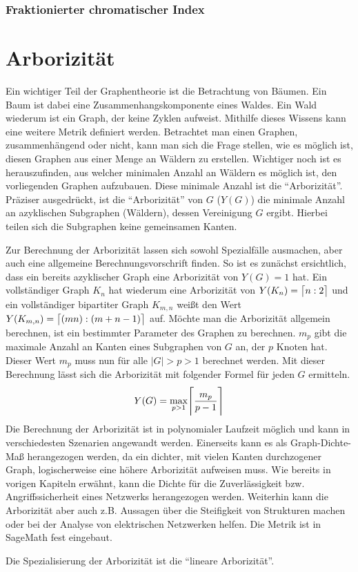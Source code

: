 \documentclass[a4paper,12pt,ngerman,chapterprefix=false,listof=totoc,bibliography=totoc]{scrreprt}
\DeclarePairedDelimiter{\ceil}{\lceil}{\rceil}
\begin{document}
\subsubsection*{Fraktionierter chromatischer Index}
{

}

\section{Arborizität}
{
Ein wichtiger Teil der Graphentheorie ist die Betrachtung von Bäumen. Ein Baum ist dabei eine Zusammenhangskomponente eines Waldes. Ein Wald wiederum ist ein Graph, der keine Zyklen aufweist. Mithilfe dieses Wissens kann eine weitere Metrik definiert werden. Betrachtet man einen Graphen, zusammenhängend oder nicht, kann man sich die Frage stellen, wie es möglich ist, diesen Graphen aus einer Menge an Wäldern zu erstellen. Wichtiger noch ist es herauszufinden, aus welcher minimalen Anzahl an Wäldern es möglich ist, den vorliegenden Graphen aufzubauen. Diese minimale Anzahl ist die "`Arborizität"'. Präziser ausgedrückt, ist die "`Arborizität"' von \(G\) (\(Y(G)\)) die minimale Anzahl an azyklischen Subgraphen (Wäldern), dessen Vereinigung \(G\) ergibt. Hierbei teilen sich die Subgraphen keine gemeinsamen Kanten. \cite{weisstein_arboricity_nodate}

Zur Berechnung der Arborizität lassen sich sowohl Spezialfälle ausmachen, aber auch eine allgemeine Berechnungsvorschrift finden. So ist es zunächst ersichtlich, dass ein bereits azyklischer Graph eine Arborizität von \(Y(G)=1\) hat. Ein vollständiger Graph \(K_n\) hat wiederum eine Arborizität von \(Y(K_n)=\ceil[\big]{n:2}\) und ein vollständiger bipartiter Graph \(K_{m,n}\) weißt den Wert \(Y(K_{m,n})=\ceil[\big]{(mn):(m+n-1)}\) auf. Möchte man die Arborizität allgemein berechnen, ist ein bestimmter Parameter des Graphen zu berechnen. \(m_p\) gibt die maximale Anzahl an Kanten eines Subgraphen von \(G\) an, der \(p\) Knoten hat. Dieser Wert \(m_p\) muss nun für alle \(|G|>p>1\) berechnet werden. Mit dieser Berechnung lässt sich die Arborizität mit folgender Formel für jeden \(G\) ermitteln. \cite{weisstein_arboricity_nodate,nash-williams_edge-disjoint_1961}
\[Y(G)=\max_{p>1}\ceil[\Bigg]{\frac{m_p}{p-1}}\]
Die Berechnung der Arborizität ist in polynomialer Laufzeit möglich und kann in verschiedesten Szenarien angewandt werden. Einerseits kann es als Graph-Dichte-Maß herangezogen werden, da ein dichter, mit vielen Kanten durchzogener Graph, logischerweise eine höhere Arborizität aufweisen muss. Wie bereits in vorigen Kapiteln erwähnt, kann die Dichte für die Zuverlässigkeit bzw. Angriffssicherheit eines Netzwerks herangezogen werden. Weiterhin kann die Arborizität aber auch z.B. Aussagen über die Steifigkeit von Strukturen machen oder bei der Analyse von elektrischen Netzwerken helfen. Die Metrik ist in SageMath fest eingebaut. \cite{gabow_forests_1992,sagemath_graph_2020}

Die Spezialisierung der Arborizität ist die "`lineare Arborizität"'. %
}
\end{document}
